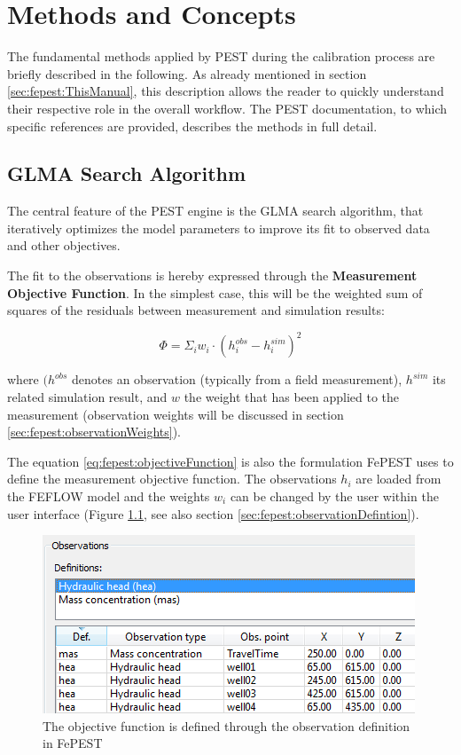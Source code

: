 \chapter{Methods and Concepts}
\label{sec:fepest:methods}

The fundamental methods applied by PEST during the calibration process are briefly described in the following. As already mentioned in section \ref{sec:fepest:ThisManual}, this description allows the reader to quickly understand their respective role in the overall workflow. The PEST documentation, to which specific references are provided, describes the methods in full detail.

\section{GLMA Search Algorithm}

The central feature of the PEST engine is the GLMA search algorithm, that iteratively optimizes the model parameters to improve its fit to observed data and other objectives. 

The fit to the observations is hereby expressed through the \textbf{Measurement Objective Function}. In the simplest case, this will be the weighted sum of squares of the residuals between measurement and simulation results: 

\begin{equation}
\Phi = \Sigma_i w_i \cdot (h_i^{obs} - h_i^{sim})^2
\label{eq:fepest:objectiveFunction}
\end{equation}

where $(h^{obs}$ denotes an observation (typically from a field measurement), $h^{sim}$ its related simulation result, and $w$ the weight that has been applied to the measurement (observation weights will be discussed in section \ref{sec:fepest:observationWeights}).

The equation \ref{eq:fepest:objectiveFunction} is also the formulation FePEST uses to define the measurement objective function. The observations $h_i$ are loaded from the FEFLOW model and the weights $w_i$ can be changed by the user within the user interface (Figure \ref{fig:fepest:ObservationDefintion}, see also section \ref{sec:fepest:observationDefintion}). 

\begin{figure}
	\center
	\includegraphics[width=\columnwidth]{figures/ObservationDefintion.png}
\caption{The objective function is defined through the observation definition in FePEST}
\label{fig:fepest:ObservationDefintion}
\end{figure}


